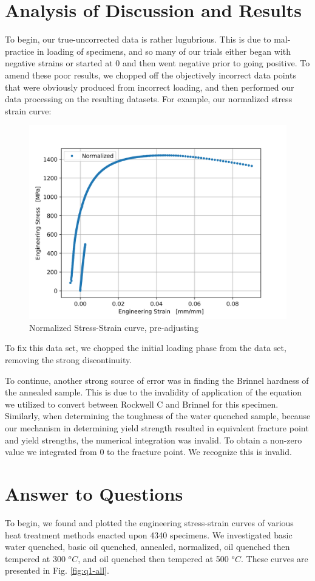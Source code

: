 \documentclass{article}
\begin{document}
\section{Analysis of Discussion and Results}
To begin, our true-uncorrected data is rather lugubrious. This is due to mal-practice in loading of specimens, and so many of our trials either began with negative strains or started at 0 and then went negative prior to going positive. To amend these poor results, we chopped off the objectively incorrect data points that were obviously produced from incorrect loading, and then performed our data processing on the resulting datasets. For example, our normalized stress strain curve:

\begin{figure}[!h!]
    \centering
    \includegraphics[width=0.5\linewidth]{plots/bs_plot.png}
    \caption{Normalized Stress-Strain curve, pre-adjusting}
    \label{fig:bs-plot}
\end{figure}

To fix this data set, we chopped the initial loading phase from the data set, removing the strong discontinuity. 

To continue, another strong source of error was in finding the Brinnel hardness of the annealed sample. This is due to the invalidity of application of the equation we utilized to convert between Rockwell C and Brinnel for this specimen. Similarly, when determining the toughness of the water quenched sample, because our mechanism in determining yield strength resulted in equivalent fracture point and yield strengths, the numerical integration was invalid. To obtain a non-zero value we integrated from 0 to the fracture point. We recognize this is invalid. 


\section{Answer to Questions}
To begin, we found and plotted the engineering stress-strain curves of various heat treatment methods enacted upon 4340 specimens. We investigated basic water quenched, basic oil quenched, annealed, normalized, oil quenched then tempered at 300 $^oC$, and oil quenched then tempered at 500 $^oC$. These curves are presented in Fig. \ref{fig:q1-all}.
\end{document}
